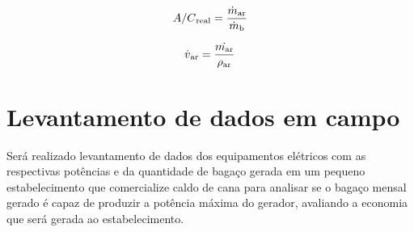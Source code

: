 \begin{equation}
A/C\textsubscript{real} = \frac{\dot{m}\textsubscript{ar}}{\dot{m}\textsubscript{b}}
\end{equation}

\begin{equation}\label{vazao_ar}
\dot{v}\textsubscript{ar} = \frac{\dot{m\textsubscript{ar}}}{\rho\textsubscript{ar}}
\end{equation}

\section{Levantamento de dados em campo}

Será realizado levantamento de dados dos equipamentos elétricos com as respectivas potências e da quantidade de bagaço gerada em um pequeno estabelecimento que comercialize caldo de cana para analisar se o bagaço mensal gerado é capaz de produzir a potência máxima do gerador, avaliando a economia que será gerada ao estabelecimento.


